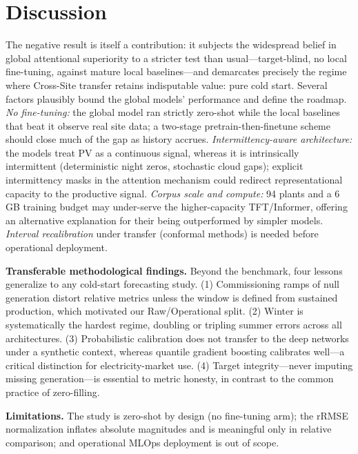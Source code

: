 \documentclass[conference]{IEEEtran}
\begin{document}
\section{Discussion}
The negative result is itself a contribution: it subjects the widespread belief in global
attentional superiority to a stricter test than usual---target-blind, no local fine-tuning,
against mature local baselines---and demarcates precisely the regime where Cross-Site
transfer retains indisputable value: pure cold start. Several factors plausibly bound the
global models' performance and define the roadmap. \emph{No fine-tuning:} the global model
ran strictly zero-shot while the local baselines that beat it observe real site data; a
two-stage pretrain-then-finetune scheme should close much of the gap as history accrues.
\emph{Intermittency-aware architecture:} the models treat PV as a continuous signal, whereas
it is intrinsically intermittent (deterministic night zeros, stochastic cloud gaps);
explicit intermittency masks in the attention mechanism could redirect representational
capacity to the productive signal. \emph{Corpus scale and compute:} 94 plants and a 6\,GB
training budget may under-serve the higher-capacity TFT/Informer, offering an alternative
explanation for their being outperformed by simpler models. \emph{Interval recalibration}
under transfer (conformal methods) is needed before operational deployment.

\textbf{Transferable methodological findings.} Beyond the benchmark, four lessons generalize
to any cold-start forecasting study. (1) Commissioning ramps of null generation distort
relative metrics unless the window is defined from sustained production, which motivated our
Raw/Operational split. (2) Winter is systematically the hardest regime, doubling or tripling
summer errors across all architectures. (3) Probabilistic calibration does not transfer to
the deep networks under a synthetic context, whereas quantile gradient boosting calibrates
well---a critical distinction for electricity-market use. (4) Target integrity---never
imputing missing generation---is essential to metric honesty, in contrast to the common
practice of zero-filling.

\textbf{Limitations.} The study is zero-shot by design (no fine-tuning arm); the rRMSE
normalization inflates absolute magnitudes and is meaningful only in relative comparison;
and operational MLOps deployment is out of scope.
\end{document}
